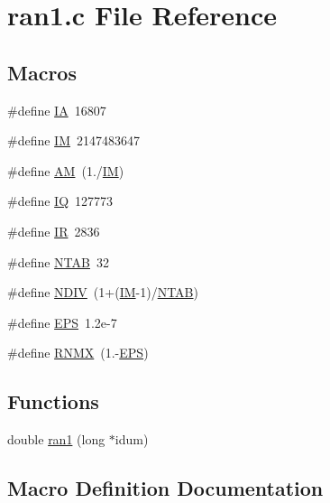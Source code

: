 \section{ran1.\-c File Reference}
\label{no__sprng_2ran1_8c}
\subsection*{Macros}
\begin{DoxyCompactItemize}
\item 
\#define \hyperlink{no__sprng_2ran1_8c_ae4b0efde4fa4613b407716d265d19b0a}{I\-A}~16807
\item 
\#define \hyperlink{no__sprng_2ran1_8c_a51c0dfe766601d31e907fceae818a7ca}{I\-M}~2147483647
\item 
\#define \hyperlink{no__sprng_2ran1_8c_ad301e6a88b1c01108f4867f2ea6f683c}{A\-M}~(1./\hyperlink{rng_2common_2ran1_8c_a51c0dfe766601d31e907fceae818a7ca}{I\-M})
\item 
\#define \hyperlink{no__sprng_2ran1_8c_ab7c5f3342853af6bb48d0ca00b05efbe}{I\-Q}~127773
\item 
\#define \hyperlink{no__sprng_2ran1_8c_a68e22635ff207d8ca10459833856bd75}{I\-R}~2836
\item 
\#define \hyperlink{no__sprng_2ran1_8c_a0e93cfb2d62849853fd34957ba6e6fdc}{N\-T\-A\-B}~32
\item 
\#define \hyperlink{no__sprng_2ran1_8c_a62339d74dd5d9d00480e1a288cf88fe8}{N\-D\-I\-V}~(1+(\hyperlink{rng_2common_2ran1_8c_a51c0dfe766601d31e907fceae818a7ca}{I\-M}-\/1)/\hyperlink{rng_2common_2ran1_8c_a0e93cfb2d62849853fd34957ba6e6fdc}{N\-T\-A\-B})
\item 
\#define \hyperlink{no__sprng_2ran1_8c_a6ebf6899d6c1c8b7b9d09be872c05aae}{E\-P\-S}~1.\-2e-\/7
\item 
\#define \hyperlink{no__sprng_2ran1_8c_aa7436c9270ffb06f8c1eae8d2e605cec}{R\-N\-M\-X}~(1.-\/\hyperlink{rng_2common_2ran1_8c_a6ebf6899d6c1c8b7b9d09be872c05aae}{E\-P\-S})
\end{DoxyCompactItemize}
\subsection*{Functions}
\begin{DoxyCompactItemize}
\item 
double \hyperlink{no__sprng_2ran1_8c_a1b3a69f1cc435a6a5dbedfa65c6796c0}{ran1} (long $\ast$idum)
\end{DoxyCompactItemize}


\subsection{Macro Definition Documentation}
